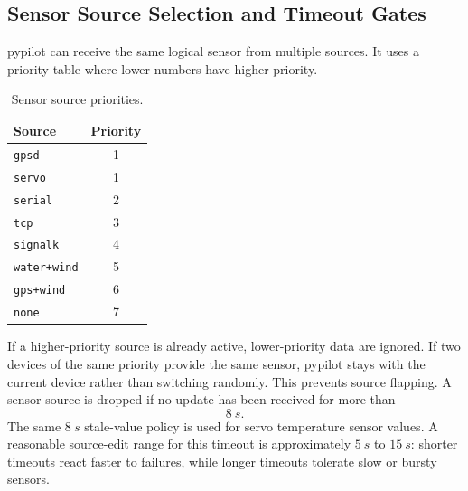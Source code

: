\documentclass[11pt,twocolumn]{article}
\begin{document}
\subsection{Sensor Source Selection and Timeout Gates}
pypilot can receive the same logical sensor from multiple sources.  It
uses a priority table where lower numbers have higher priority.
\begin{table}[h]
\centering
\caption{Sensor source priorities.}
\label{tab:pypilot-source-priority}
\begin{tabular}{lc}
\toprule
Source & Priority \\
\midrule
\texttt{gpsd} & 1 \\
\texttt{servo} & 1 \\
\texttt{serial} & 2 \\
\texttt{tcp} & 3 \\
\texttt{signalk} & 4 \\
\texttt{water+wind} & 5 \\
\texttt{gps+wind} & 6 \\
\texttt{none} & 7 \\
\bottomrule
\end{tabular}
\end{table}
If a higher-priority source is already active, lower-priority data are
ignored.  If two devices of the same priority provide the same sensor,
pypilot stays with the current device rather than switching randomly.
This prevents source flapping.
A sensor source is dropped if no update has been received for more than
\[
\SI{8}{s}.
\]
The same \(\SI{8}{s}\) stale-value policy is used for servo temperature
sensor values.  A reasonable source-edit range for this timeout is
approximately \(\SI{5}{s}\) to \(\SI{15}{s}\): shorter timeouts react
faster to failures, while longer timeouts tolerate slow or bursty sensors.
\end{document}
